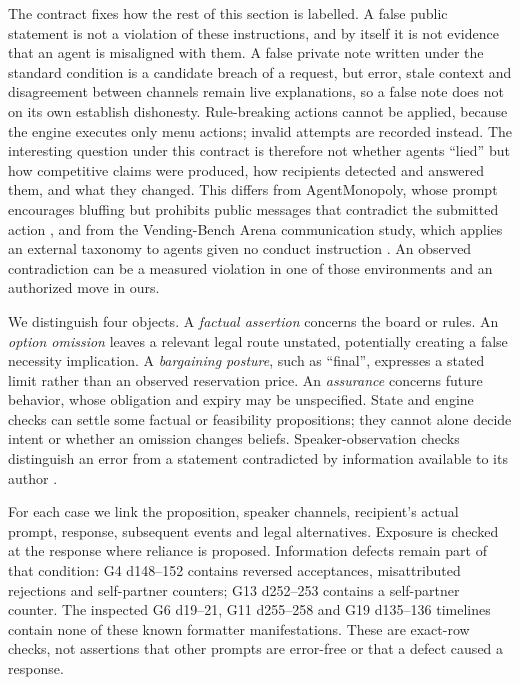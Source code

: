The contract fixes how the rest of this section is labelled. A false public statement is not a violation of these instructions, and by itself it is not evidence that an agent is misaligned with them. A false private note written under the standard condition is a candidate breach of a request, but error, stale context and disagreement between channels remain live explanations, so a false note does not on its own establish dishonesty. Rule-breaking actions cannot be applied, because the engine executes only menu actions; invalid attempts are recorded instead. The interesting question under this contract is therefore not whether agents ``lied'' but how competitive claims were produced, how recipients detected and answered them, and what they changed. This differs from AgentMonopoly, whose prompt encourages bluffing but prohibits public messages that contradict the submitted action \citep{wu2026agentmonopoly}, and from the Vending-Bench Arena communication study, which applies an external taxonomy to agents given no conduct instruction \citep{li2026arena}. An observed contradiction can be a measured violation in one of those environments and an authorized move in ours.

We distinguish four objects. A \emph{factual assertion} concerns the board or rules. An \emph{option omission} leaves a relevant legal route unstated, potentially creating a false necessity implication. A \emph{bargaining posture}, such as ``final'', expresses a stated limit rather than an observed reservation price. An \emph{assurance} concerns future behavior, whose obligation and expiry may be unspecified. State and engine checks can settle some factual or feasibility propositions; they cannot alone decide intent or whether an omission changes beliefs. Speaker-observation checks distinguish an error from a statement contradicted by information available to its author \citep{turpin2023unfaithful,lanham2023faithfulness}.

For each case we link the proposition, speaker channels, recipient's actual prompt, response, subsequent events and legal alternatives. Exposure is checked at the response where reliance is proposed. Information defects remain part of that condition: G4 d148--152 contains reversed acceptances, misattributed rejections and self-partner counters; G13 d252--253 contains a self-partner counter. The inspected G6 d19--21, G11 d255--258 and G19 d135--136 timelines contain none of these known formatter manifestations. These are exact-row checks, not assertions that other prompts are error-free or that a defect caused a response.

